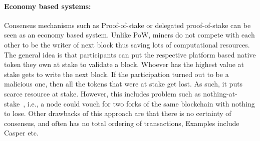 \paragraph{Economy based systems:} Consensus mechanisms such as Proof-of-stake
or delegated proof-of-stake can be seen as an economy based system. Unlike PoW,
miners do not compete with each other to be the writer of next block thus
saving lots of computational resources. The general idea is that participants
can put the respective platform based native token they own at stake to
validate a block. Whoever has the highest value at stake gets to write the next
block. If the participation turned out to be a malicious one, then all the
tokens that were at stake get lost. As such, it puts scarce resource at stake.
However, this includes problem such as nothing-at-stake~\cite{houy2014will},
i.e., a node could vouch for two forks of the same blockchain with nothing to
lose. Other drawbacks of this approach are that there is no certainty of
consensus, and often has no total ordering of transactions, Examples include
Casper etc. 
